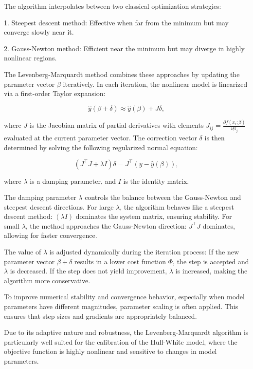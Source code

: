 The algorithm interpolates between two classical optimization strategies:

1. Steepest descent method: Effective when far from the minimum but may converge slowly near it.

2. Gauss-Newton method: Efficient near the minimum but may diverge in highly nonlinear regions.

The Levenberg-Marquardt method combines these approaches by updating the parameter vector $\beta$ iteratively. In each iteration, the nonlinear model is linearized via a first-order Taylor expansion:

\begin{equation}
\hat{y}(\beta + \delta) \approx \hat{y}(\beta) + J \delta,
\end{equation}

where $J$ is the Jacobian matrix of partial derivatives with elements $J_{ij} = \frac{\partial f(x_i; \beta)}{\partial \beta_j}$ evaluated at the current parameter vector. The correction vector $\delta$ is then determined by solving the following regularized normal equation:

\begin{equation}
(J^\top J + \lambda I)\delta = J^\top (y - \hat{y}(\beta)),
\end{equation}

where $\lambda$ is a damping parameter, and $I$ is the identity matrix.

The damping parameter $\lambda$ controls the balance between the Gauss-Newton and steepest descent directions. For large $\lambda$, the algorithm behaves like a steepest descent method: $(\lambda I)$ dominates the system matrix, ensuring stability. For small $\lambda$, the method approaches the Gauss-Newton direction: $J^\top J$ dominates, allowing for faster convergence.

The value of $\lambda$ is adjusted dynamically during the iteration process:
If the new parameter vector $\beta + \delta$ results in a lower cost function $\Phi$, the step is accepted and $\lambda$ is decreased. If the step does not yield improvement, $\lambda$ is increased, making the algorithm more conservative.

To improve numerical stability and convergence behavior, especially when model parameters have different magnitudes, parameter scaling is often applied. This ensures that step sizes and gradients are appropriately balanced.

Due to its adaptive nature and robustness, the Levenberg-Marquardt algorithm is particularly well suited for the calibration of the Hull-White model, where the objective function is highly nonlinear and sensitive to changes in model parameters.

